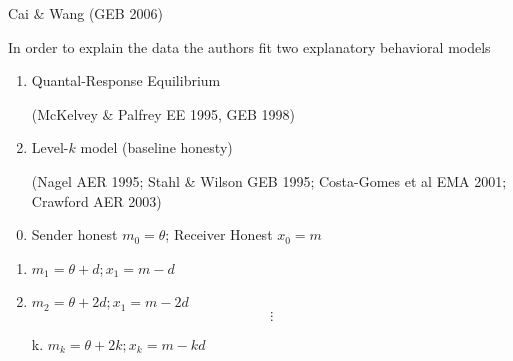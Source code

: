\documentclass{beamer}
\begin{document}
\begin{frame}{Cai \& Wang (GEB 2006)}
	\begin{card}
In order to explain the data the authors fit two explanatory behavioral models
		\begin{enumerate}
			\item Quantal-Response Equilibrium

			(McKelvey \& Palfrey EE 1995, GEB 1998)
			\item Level-$k$ model (baseline honesty)
			
			(Nagel AER 1995; Stahl \& Wilson GEB 1995; Costa-Gomes et al EMA 2001; Crawford AER 2003)
		\end{enumerate}
	\end{card}
\end{frame}


\begin{frame}
	\begin{card}
		\begin{enumerate}
			\setcounter{enumi}{-1}
			\item Sender honest $m_0=\theta$; Receiver Honest $x_0=m$
			\item $m_1=\theta+d ; x_1=m-d$
			\item $m_2=\theta+2 d ; x_1=m-2 d$ 
			$$\vdots$$ 
			\item[k.]  $m_k=\theta+2 k ; x_k=m-k d$
		\end{enumerate}
		\end{card}

\end{frame}
\end{document}
